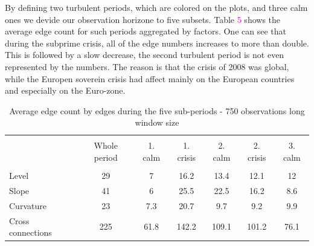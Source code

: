 \documentclass[12pt,bibliography=totoc]{article}
\begin{document}

By defining two turbulent periods, which are colored on the plots, and three calm ones we devide our observation horizone to five subsets. Table \textcolor{magenta}{5} shows the average edge count for such periods aggregated by factors. One can see that during the subprime crisis, all of the edge numbers increases to more than double. This is followed by a slow decrease, the second turbulent period is not even represented by the numbers. The reason is that the crisis of 2008 was global, while the Europen soverein crisis had affect mainly on the European countries and especially on the Euro-zone.


\begin{table}[H]
\fontsize{10}{10}\selectfont
\centering%
\begin{tabular}{l | cccccc}%
\hline\hline \\ [-1.5ex]                         %


		& 	Whole period  &	1. calm	&	1. crisis& 	2. calm& 	2. crisis&	 3. calm \\
\hline \\ [-1.5ex]  
Level	&		29	&	7	&	16.2	&	13.4	&  	12.1	&	 12\\
Slope	&		41	&	6	&	25.5	&	22.5	& 	16.2	& 	8.6\\
Curvature	&	23	&	7.3	&	20.7	&	9.7	& 	9.2	&	 9.9\\
Cross connections	&		225	&	61.8	&	142.2	&	109.1	& 	101.2	& 	76.1\\

\hline            
\end{tabular}
\label{table:nonlin}%
\caption{Average edge count by edges during the five sub-periods - 750 observations long window size} %


\end{table}
\end{document}
